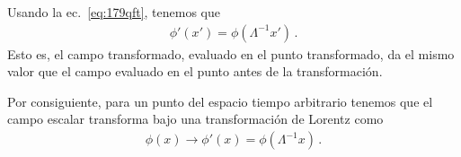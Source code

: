 Usando la ec.~\eqref{eq:179qft}, tenemos que
\begin{align}
    \phi'(x')=\phi(\Lambda^{-1}x')\,.
\end{align}
Esto es, el campo transformado, evaluado en el punto transformado, da el mismo valor que el campo evaluado en el punto antes de la transformación. 

\begin{frame}

Por consiguiente, para un punto del espacio tiempo arbitrario tenemos
que el campo escalar transforma bajo una transformación de Lorentz como
\begin{align}
  \label{eq:scalarlorentz}
 \phi(x)\to  \phi'(x)=\phi(\Lambda^{-1}x)\,.
\end{align}
\end{frame}







